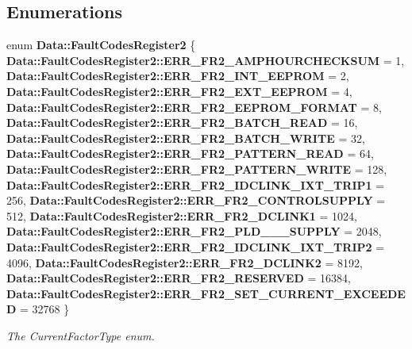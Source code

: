 \subsection*{Enumerations}
\begin{DoxyCompactItemize}
\item 
enum \textbf{ Data\+::\+Fault\+Codes\+Register2} \{ \newline
\textbf{ Data\+::\+Fault\+Codes\+Register2\+::\+E\+R\+R\+\_\+\+F\+R2\+\_\+\+A\+M\+P\+H\+O\+U\+R\+C\+H\+E\+C\+K\+S\+UM} = 1, 
\textbf{ Data\+::\+Fault\+Codes\+Register2\+::\+E\+R\+R\+\_\+\+F\+R2\+\_\+\+I\+N\+T\+\_\+\+E\+E\+P\+R\+OM} = 2, 
\textbf{ Data\+::\+Fault\+Codes\+Register2\+::\+E\+R\+R\+\_\+\+F\+R2\+\_\+\+E\+X\+T\+\_\+\+E\+E\+P\+R\+OM} = 4, 
\textbf{ Data\+::\+Fault\+Codes\+Register2\+::\+E\+R\+R\+\_\+\+F\+R2\+\_\+\+E\+E\+P\+R\+O\+M\+\_\+\+F\+O\+R\+M\+AT} = 8, 
\newline
\textbf{ Data\+::\+Fault\+Codes\+Register2\+::\+E\+R\+R\+\_\+\+F\+R2\+\_\+\+B\+A\+T\+C\+H\+\_\+\+R\+E\+AD} = 16, 
\textbf{ Data\+::\+Fault\+Codes\+Register2\+::\+E\+R\+R\+\_\+\+F\+R2\+\_\+\+B\+A\+T\+C\+H\+\_\+\+W\+R\+I\+TE} = 32, 
\textbf{ Data\+::\+Fault\+Codes\+Register2\+::\+E\+R\+R\+\_\+\+F\+R2\+\_\+\+P\+A\+T\+T\+E\+R\+N\+\_\+\+R\+E\+AD} = 64, 
\textbf{ Data\+::\+Fault\+Codes\+Register2\+::\+E\+R\+R\+\_\+\+F\+R2\+\_\+\+P\+A\+T\+T\+E\+R\+N\+\_\+\+W\+R\+I\+TE} = 128, 
\newline
\textbf{ Data\+::\+Fault\+Codes\+Register2\+::\+E\+R\+R\+\_\+\+F\+R2\+\_\+\+I\+D\+C\+L\+I\+N\+K\+\_\+\+I\+X\+T\+\_\+\+T\+R\+I\+P1} = 256, 
\textbf{ Data\+::\+Fault\+Codes\+Register2\+::\+E\+R\+R\+\_\+\+F\+R2\+\_\+\+C\+O\+N\+T\+R\+O\+L\+S\+U\+P\+P\+LY} = 512, 
\textbf{ Data\+::\+Fault\+Codes\+Register2\+::\+E\+R\+R\+\_\+\+F\+R2\+\_\+\+D\+C\+L\+I\+N\+K1} = 1024, 
\textbf{ Data\+::\+Fault\+Codes\+Register2\+::\+E\+R\+R\+\_\+\+F\+R2\+\_\+\+P\+L\+D\+\_\+\_\+\_\+\+S\+U\+P\+P\+LY} = 2048, 
\newline
\textbf{ Data\+::\+Fault\+Codes\+Register2\+::\+E\+R\+R\+\_\+\+F\+R2\+\_\+\+I\+D\+C\+L\+I\+N\+K\+\_\+\+I\+X\+T\+\_\+\+T\+R\+I\+P2} = 4096, 
\textbf{ Data\+::\+Fault\+Codes\+Register2\+::\+E\+R\+R\+\_\+\+F\+R2\+\_\+\+D\+C\+L\+I\+N\+K2} = 8192, 
\textbf{ Data\+::\+Fault\+Codes\+Register2\+::\+E\+R\+R\+\_\+\+F\+R2\+\_\+\+R\+E\+S\+E\+R\+V\+ED} = 16384, 
\textbf{ Data\+::\+Fault\+Codes\+Register2\+::\+E\+R\+R\+\_\+\+F\+R2\+\_\+\+S\+E\+T\+\_\+\+C\+U\+R\+R\+E\+N\+T\+\_\+\+E\+X\+C\+E\+E\+D\+ED} = 32768
 \}\begin{DoxyCompactList}\small\item\em The Current\+Factor\+Type enum. \end{DoxyCompactList}
\end{DoxyCompactItemize}
